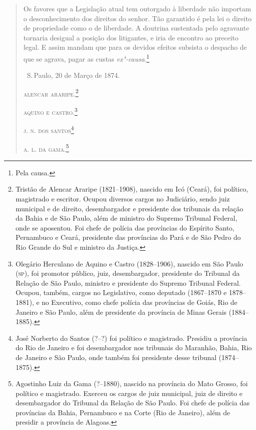 \begin{quote}
Os favores que a Legislação atual tem outorgado à liberdade não importam
o desconhecimento dos direitos do senhor. Tão garantido é pela lei o
direito de propriedade como o de liberdade. A doutrina sustentada pelo
agravante tornaria desigual a posição dos litigantes, e iria de encontro
ao preceito legal. E assim mandam que para os devidos efeitos subsista o
despacho de que se agrava, pagar as custas \emph{ex"-causa}.\footnote{
  Pela causa.}

\medskip

\hfill\ S.\,Paulo, 20 de Março de 1874.\smallskip

\hfill\textsc{alencar araripe}.\footnote{Tristão de Alencar Araripe (1821--1908),
  nascido em Icó (Ceará), foi político, magistrado e escritor. Ocupou
  diversos cargos no Judiciário, sendo juiz municipal e de direito,
  desembargador e presidente dos tribunais da relação da Bahia e de São
  Paulo, além de ministro do Supremo Tribunal Federal, onde se
  aposentou. Foi chefe de polícia das províncias do Espírito Santo,
  Pernambuco e Ceará, presidente das províncias do Pará e de São Pedro
  do Rio Grande do Sul e ministro da Justiça.}

\hfill\textsc{aquino e castro}.\footnote{Olegário Herculano de Aquino e Castro
  (1828--1906), nascido em São Paulo (\textsc{sp}), foi promotor público, juiz,
  desembargador, presidente do Tribunal da Relação de São Paulo,
  ministro e presidente do Supremo Tribunal Federal. Ocupou, também,
  cargos no Legislativo, como deputado (1867--1870 e 1878--1881), e no
  Executivo, como chefe polícia das províncias de Goiás, Rio de Janeiro
  e São Paulo, além de presidente da província de Minas Gerais
  (1884--1885).}

\hfill\textsc{j. n. dos santos}\footnote{José Norberto do Santos (?--?) foi político e
  magistrado. Presidiu a província do Rio de Janeiro e foi desembargador
  nos tribunais do Maranhão, Bahia, Rio de Janeiro e São Paulo, onde
  também foi presidente desse tribunal (1874--1875).}

\hfill\textsc{a. l. da gama}.\footnote{Agostinho Luiz da Gama (?--1880), nascido na 
  província do Mato Grosso, foi político e magistrado. Exerceu os cargos
  de juiz municipal, juiz de direito e desembargador do Tribunal da
  Relação de São Paulo. Foi chefe de polícia das províncias da Bahia,
  Pernambuco e na Corte (Rio de Janeiro), além de presidir a província
  de Alagoas.} \label{agostinho}
\end{quote}  

\asterisc

